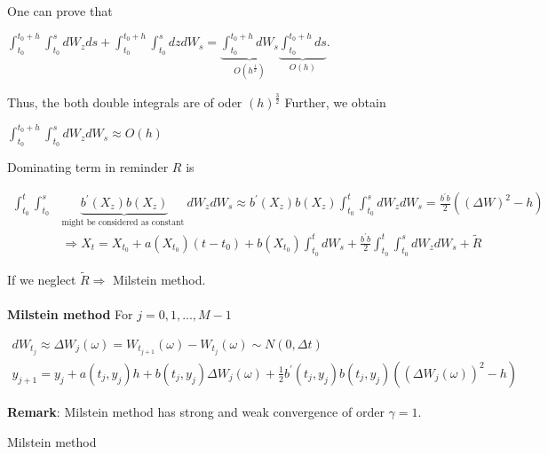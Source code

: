 \documentclass{article}
\begin{document}
One can prove that
\begin{center}
	$\int_{t_{0}}^{t_{0}+h} \int_{t_{0}}^{s} d W_{z} d s+\int_{t_{0}}^{t_{0}+h} \int_{t_{0}}^{s} d z d W_{s}=\underbrace{\int_{t_{0}}^{t_{0}+h} d W_{s}}_{O\left(h^{\frac{1}{2}}\right)} \underbrace{\int_{t_{0}}^{t_{0}+h} d s}_{O(h)} .$
\end{center}
Thus, the both double integrals are of oder $\left( h\right)^{\frac{3}{2} }  $
Further, we obtain
\begin{center}
	$\int_{t_{0}}^{t_{0}+h} \int_{t_{0}}^{s} d W_{z} d W_{s} \approx O(h)$
\end{center}
Dominating term in reminder $R$ is
\begin{center}
	$\begin{aligned} \int_{t_{0}}^{t} \int_{t_{0}}^{s} & \underbrace{b^{\prime}\left(X_{z}\right) b\left(X_{z}\right)}_{\text {might be considered as constant }} d W_{z} d W_{s} \approx b^{\prime}\left(X_{z}\right) b\left(X_{z}\right) \int_{t_{0}}^{t} \int_{t_{0}}^{s} d W_{z} d W_{s}=\frac{b^{\prime} b}{2}\left((\Delta W)^{2}-h\right) \\ & \Rightarrow X_{t}=X_{t_{0}}+a\left(X_{t_{0}}\right)\left(t-t_{0}\right)+b\left(X_{t_{0}}\right) \int_{t_{0}}^{t} d W_{s}+\frac{b^{\prime} b}{2} \int_{t_{0}}^{t} \int_{t_{0}}^{s} d W_{z} d W_{s}+\widetilde{R} \end{aligned}$
\end{center}
If we neglect $\widetilde{R} \Rightarrow$ Milstein method.\\~\\
\textbf{Milstein method}
For $j=0,1,...,M-1$
\begin{center}
	$\begin{gathered}dW_{t_{j}}\approx \Delta W_{j}\left( \omega \right)  =W_{t_{j+1}}\left( \omega \right)  -W_{t_{j}}\left( \omega \right)  \sim N\left( 0,\Delta t\right)  \\ y_{j+1}=y_{j}+a\left(t_{j}, y_{j}\right) h+b\left(t_{j}, y_{j}\right) \Delta W_{j}(\omega)+\frac{1}{2} b^{\prime}\left(t_{j}, y_{j}\right) b\left(t_{j}, y_{j}\right)\left(\left(\Delta W_{j}(\omega)\right)^{2}-h\right)\end{gathered}$
\end{center}
\textbf{Remark}: Milstein method has strong and weak convergence of order $\gamma=1$.
\begin{algorithm}
\caption{Milstein method}\label{algorithm}
\end{algorithm}
\end{document}
